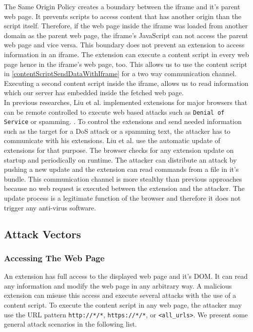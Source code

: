 	The Same Origin Policy creates a boundary between the iframe and it's parent web page. It prevents scripts to access content that has another origin than the script itself. Therefore, if the web page inside the iframe was loaded from another domain as the parent web page, the iframe's JavaScript can not access the parent web page and vice versa. This boundary does not prevent an extension to access information in an iframe. The extension can execute a content script in every web page hence in the iframe's web page, too. This allows us to use the content script in \autoref{contentScriptSendDataWithIframe} for a two way communication channel. Executing a second content script inside the iframe, allows us to read information which our server has embedded inside the fetched web page. \\
	
	In previous researches, Liu et al. implemented extensions for major browsers that can be remote controlled to execute web based attacks such as \texttt{Denial of Service} or spamming. \cite{liu2011botnet, Liu12chromeextensions:}. To control the extensions and send needed information such as the target for a DoS attack or a spamming text, the attacker has to communicate with his extensions. Liu et al. use the automatic update of extensions for that purpose. The browser checks for any extension update on startup and periodically on runtime. The attacker can distribute an attack by pushing a new update and the extension can read commands from a file in it's bundle. This communication channel is more stealthy than previous approaches because no web request is executed between the extension and the attacker. The update process is a legitimate function of the browser and therefore it does not trigger any anti-virus software. \\			



\subsection{Attack Vectors}



\subsubsection{Accessing The Web Page}
	
	An extension has full access to the displayed web page and it's DOM. It can read any information and modify the web page in any arbitrary way. A malicious extension can misuse this access and execute several attacks with the use of a content script. To execute the content script in any web page, the attacker may use the URL pattern \texttt{http://*/*}, \texttt{https://*/*}, or \texttt{<all\_urls>}. We present some general attack scenarios in the following list. \\
	
